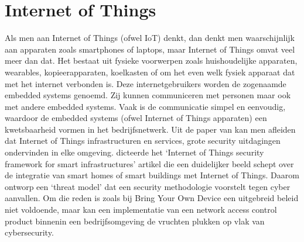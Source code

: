 \section{Internet of Things}
Als men aan Internet of Things (ofwel IoT) denkt, dan denkt men waarschijnlijk aan apparaten zoals smartphones of laptops, maar Internet of Things omvat veel meer dan dat. Het bestaat uit fysieke voorwerpen zoals huishoudelijke apparaten, wearables, kopieerapparaten, koelkasten of om het even welk fysiek apparaat dat met het internet verbonden is.
\newline
\newline 
Deze internetgebruikers worden de zogenaamde embedded systems genoemd. Zij kunnen communiceren met personen maar ook met andere embedded systems. Vaak is de communicatie simpel en eenvoudig, waardoor de embedded systems (ofwel Internet of Things apparaten) een kwetsbaarheid vormen in het bedrijfsnetwerk.
\newline
\newline
Uit de paper van \cite{Salim2016} kan men afleiden dat Internet of Things infrastructuren en services, grote security uitdagingen ondervinden in elke omgeving. \cite{Salim2016} dicteerde het ‘Internet of Things security framework for smart infrastructures’ artikel die een duidelijker beeld schept over de integratie van smart homes of smart buildings met Internet of Things. Daarom ontworp \cite{Salim2016} een ‘threat model’ dat een security methodologie voorstelt tegen cyber aanvallen. 
\newline
\newline
Om die reden is zoals bij Bring Your Own Device een uitgebreid beleid niet voldoende, maar kan een implementatie van een network access control product binnenin een bedrijfsomgeving de vruchten plukken op vlak van cybersecurity.  

